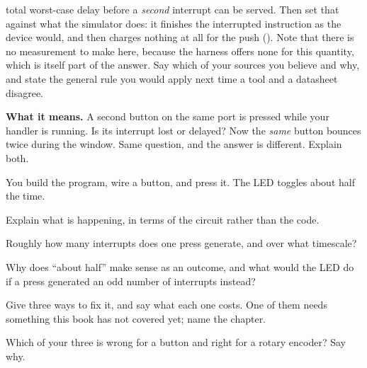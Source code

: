 \begin{parts}
    total worst-case delay before a \emph{second} interrupt can be served. Then set that
    against what the simulator does: it finishes the interrupted instruction as the device would,
    and then charges nothing at all for the push (). Note that there is no measurement
    to make here, because the harness offers none for this quantity, which is itself part of the
    answer. Say which of your sources you believe and why, and state the general rule you would
    apply next time a tool and a datasheet disagree.
  \item \textbf{What it means.} A second button on the same port is pressed while your handler is
    running. Is its interrupt lost or delayed? Now the \emph{same} button bounces twice during the
    window. Same question, and the answer is different. Explain both.
\end{parts}

\label{c3:ex:bounce}
You build the program, wire a button, and press it. The LED toggles about half the time.
\begin{parts}
  \item Explain what is happening, in terms of the circuit rather than the code.
  \item Roughly how many interrupts does one press generate, and over what timescale?
  \item Why does ``about half'' make sense as an outcome, and what would the LED do if a press
    generated an odd number of interrupts instead?
  \item Give three ways to fix it, and say what each one costs. One of them needs something this
    book has not covered yet; name the chapter.
  \item Which of your three is wrong for a button and right for a rotary encoder? Say why.
\end{parts}
